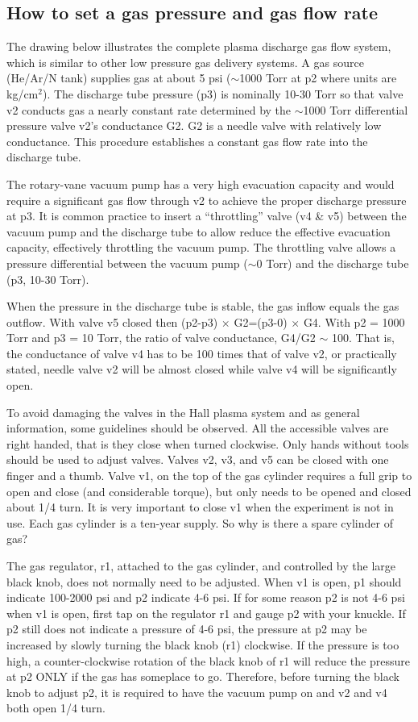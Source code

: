 \documentclass{../lab}
\begin{document}
\subsection{How to set a gas pressure and gas flow rate}

The drawing below illustrates the complete plasma discharge gas flow system, which is similar to other low pressure gas delivery systems. A gas source (He/Ar/N tank) supplies gas at about 5 psi ($\sim$1000 Torr  at p2 where units are kg/cm$^2$). The discharge tube pressure (p3) is nominally 10-30 Torr so that valve v2 conducts gas a nearly constant rate determined by the $\sim$1000 Torr differential pressure valve v2’s conductance G2. G2 is a needle valve with relatively low conductance. This procedure establishes a constant gas flow rate into the discharge tube.

The rotary-vane vacuum pump has a very high evacuation capacity and would require a significant gas flow through v2 to achieve the proper discharge pressure at p3. It is common practice to insert a ``throttling'' valve (v4 \& v5) between the vacuum pump and the discharge tube to allow reduce the effective evacuation capacity, effectively throttling the vacuum pump. The throttling valve allows a pressure differential between the vacuum pump ($\sim$0 Torr) and the discharge tube (p3, 10-30 Torr).

When the pressure in the discharge tube is stable, the gas inflow equals the gas outflow. With valve v5 closed then (p2-p3) $\times$ G2=(p3-0) $\times$ G4. With p2 = 1000 Torr and p3 = 10 Torr, the ratio of valve conductance, G4/G2 $\sim$ 100. That is, the conductance of valve v4 has to be 100 times that of valve v2, or practically stated, needle valve v2 will be almost closed while valve v4 will be significantly open.

To avoid damaging the valves in the Hall plasma system and as general information, some guidelines should be observed. All the accessible valves are right handed, that is they close when turned clockwise. Only hands without tools should be used to adjust valves. Valves v2, v3, and v5 can be closed with one finger and a thumb. Valve v1, on the top of the gas cylinder requires a full grip to open and close (and considerable torque), but only needs to be opened and closed about 1/4 turn. It is very important to close v1 when the experiment is not in use. Each gas cylinder is a ten-year supply. So why is there a spare cylinder of gas?

The gas regulator, r1, attached to the gas cylinder, and controlled by the large black knob, does not normally need to be adjusted. When v1 is open, p1 should indicate 100-2000 psi and p2 indicate 4-6 psi. If for some reason p2 is not 4-6 psi when v1 is open, first tap on the regulator r1 and gauge p2 with your knuckle. If p2 still does not indicate a pressure of 4-6 psi, the pressure at p2 may be increased by slowly turning the black knob (r1) clockwise. If the pressure is too high, a counter-clockwise rotation of the black knob of r1 will reduce the pressure at p2 ONLY if the gas has someplace to go. Therefore, before turning the black knob to adjust p2, it is required to have the vacuum pump on and v2 and v4 both open 1/4 turn.
\end{document}
